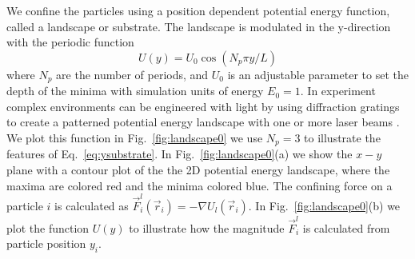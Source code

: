 \documentclass[twocolumn,preprintnumbers,amsmath,amssymb,aps,prx]{revtex4}
\begin{document}
We confine the particles using a position dependent 
potential energy function, called a landscape or substrate.
% 
The landscape is modulated in the y-direction
with the periodic function 
 \begin{equation}
   U(y) = U_0 \cos{(N_p \pi y / L)}
     \label{eq:ysubstrate}
\end{equation}
 where $N_p$ are the number of periods,
 and $U_0$ is an adjustable parameter
 to set the depth of the minima
 with simulation units of energy $E_0 = 1$. 
 In experiment 
 complex environments can be
 engineered with light by %
 using diffraction gratings to create a patterned
 potential energy landscape 
 with one or more laser beams \cite{}.
 We plot this function in 
 Fig.~\ref{fig:landscape0}
 we use $N_p = 3$ to illustrate the features of
 Eq.~\ref{eq:ysubstrate}.
 In Fig.~\ref{fig:landscape0}(a) we show 
 the $x-y$ plane with a contour plot
 of the the 2D potential energy landscape,
 where 
 the maxima are colored red and the minima colored blue.
 The confining force on a particle $i$
 is calculated as 
 $\vec{F}^{l}_i(\vec{r}_i) = -\nabla U_l(\vec{r}_i)$.
 In Fig.~\ref{fig:landscape0}(b) we plot the function
 $U(y)$ to illustrate how the magnitude
 $\vec{F}^{l}_i$ is calculated from particle position $y_i$.  
 
\end{document}
